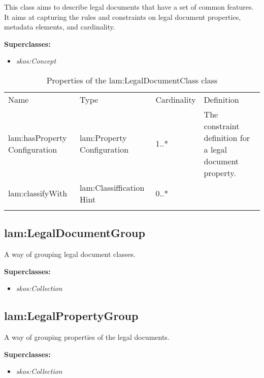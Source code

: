 This class aims to describe legal documents that have a set of common features. It aims at capturing the rules and constraints on legal document properties, metadata elements, and cardinality.

\textbf{Superclasses:}

\begin{itemize}
\itemsep1pt\parskip0pt
\item
  \emph{skos:Concept}
\end{itemize}

{
	\footnotesize
	\selectfont%
	\begin{longtable}[c]{@{}p{3cm}p{3cm}p{2cm}p{5.8cm}@{}}
		\toprule\addlinespace
		Name & Type & Cardinality & Definition
		\\\addlinespace
		\midrule\endhead
		lam:hasProperty​Configuration​ & lam:Property​Configuration​ & 1..*​ &
		The constraint definition for a legal document property. ​
		\\\addlinespace
		lam:classify​With​ & lam:Classiffication​Hint​ & 0..*​ &
		\\\addlinespace
		\bottomrule
		\addlinespace
		\caption{Properties of the lam:LegalDocumentClass class}
	\end{longtable}
}

\subsection{lam:LegalDocumentGroup}

A way of grouping legal document classes.

\textbf{Superclasses:}

\begin{itemize}
\itemsep1pt\parskip0pt
\item
  \emph{skos:Collection}
\end{itemize}

\subsection{lam:LegalPropertyGroup}

A way of grouping properties of the legal documents.

\textbf{Superclasses:}

\begin{itemize}
\itemsep1pt\parskip0pt
\item
  \emph{skos:Collection}
\end{itemize}

